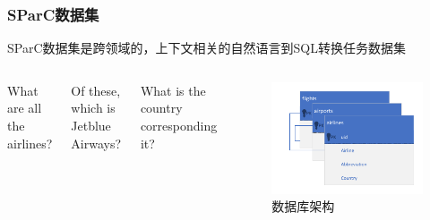 \documentclass{ctexbeamer}
\begin{document}
\begin{frame}
  \frametitle{SParC数据集}
  SParC数据集是跨领域的，上下文相关的自然语言到SQL转换任务数据集
  \begin{columns}
    What are all the airlines?


    \vspace{0.2cm}
    Of these, which is Jetblue Airways?


    \vspace{0.2cm}
    What is the country corresponding it?


    \begin{figure}
      \includegraphics[width=\textwidth,trim=30 10 10 10,clip]{figure/schema_flight_2.pdf}
      \caption{数据库架构}
    \end{figure}
  \end{columns}
\end{frame}
\end{document}
